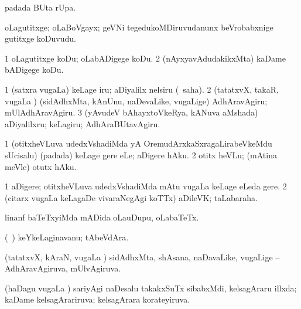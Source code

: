 {\bentry
{} 
\gl{\kirx}
\expl{}
\bmng
  padada BUta rUpa. 
\emng
\eentry

\bentry
{} 
\gl{\nA}
\expl{}
\bmng
 oLagutitxge; oLaBoVgayx; geVNi tegedukoMDiruvudanunx beVrobabxnige gutitxge koDuvudu. 
\emng
\eentry

\bentry
{} 
\gl{\sakirx}
\expl{}
\bmng
\emng
\eentry

\bentry
{} 
\gl{\sakirx}
\bmng
\bnum
\num{1} oLagutitxge koDu; oLabADigege koDu. 
\num{2} (nAyxyavAdudakikxMta) kaDame bADigege koDu. 
\enum
\emng
\eentry

\bentry
{} 
\gl{\sakirx}
\bmng
\bnum
\num{1} (satxra \mo vugaLa) keLage iru; aDiyalilx nelsiru (\akirx\ saha). 
\num{2} (tatatxvX, takaR, \mo vugaLa \vi) (sidAdhxMta, kAnUnu, naDevaLike, \mo vugaLige) AdhAravAgiru; mUlAdhAravAgiru. 
\num{3} (yAvudeV bAhayxtoVkeRya, kANuva aMshada) aDiyalilxru; keLagiru; AdhAraBUtavAgiru. 
\enum
\emng
\eentry

\bentry
{} 
\gl{\sakirx}
\expl{}
\bmng
\bnum
\num{1} (otitxheVLuva udedxVshadiMda yA OremudArxkaSxragaLirabeVkeMdu sUcisalu) (padada) keLage gere eLe; aDigere hAku. 
\num{2} otitx heVLu; (mAtina meVle) otutx hAku. 
\enum
\emng
\eentry

\bentry
{} 
\gl{\nA}
\expl{}
\bmng
\bnum
\num{1} aDigere; otitxheVLuva udedxVshadiMda mAtu \mo vugaLa keLage eLeda gere. 
\num{2} (citarx \mo vugaLa keLagaDe vivaraNegAgi koTTx) aDileVK; taLabaraha. 
\enum
\emng
\eentry

\bentry
{} 
\gl{\nA}
\expl{}
\bmng
 linanf baTeTxyiMda mADida oLauDupu, oLabaTeTx. 
\emng
\eentry

\bentry
{} 
\gl{\nA}
\expl{}
\bmng
 (\sA\ \hiV) keYkeLaginavanu; tAbeVdAra. 
\emng
\eentry

\bentry
{} 
\gl{\gu}
\expl{}
\bmng
 (tatatxvX, kAraN, \mo vugaLa \vi) sidAdhxMta, shAsana, naDavaLike, \mo vugaLige -- AdhAravAgiruva, mUlvAgiruva. 
\emng
\eentry

\bentry
{} 
\gl{\gu}
\expl{}
\bmng
 (haDagu \mo vugaLa \vi) sariyAgi naDesalu takakxSuTx sibabxMdi, kelsagAraru illxda; kaDame kelsagArariruva; kelsagArara korateyiruva. 
\emng
\eentry

}
